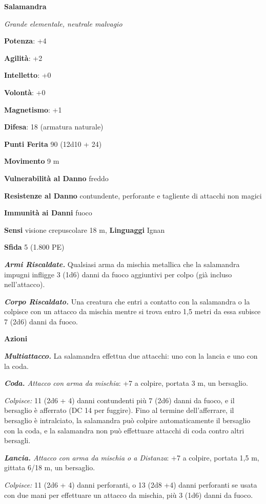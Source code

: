\begin{multicols}{2}
\textbf{Salamandra}

\emph{Grande elementale, neutrale malvagio}

\textbf{Potenza}: +4

\textbf{Agilità}: +2

\textbf{Intelletto}: +0

\textbf{Volontà}: +0

\textbf{Magnetismo}: +1

\textbf{Difesa}: 18 (armatura naturale)

\textbf{Punti Ferita} 90 (12d10 + 24)

\textbf{Movimento} 9 m

\textbf{Vulnerabilità al Danno} freddo

\textbf{Resistenze al Danno} contundente, perforante e tagliente di
attacchi non magici

\textbf{Immunità ai Danni} fuoco

\textbf{Sensi} visione crepuscolare 18 m, 
\textbf{Linguaggi} Ignan

\textbf{Sfida} 5 (1.800 PE)

\emph{\textbf{Armi Riscaldate.}} Qualsiasi arma da mischia metallica che
la salamandra impugni infligge 3 (1d6) danni da fuoco aggiuntivi per
colpo (già incluso nell'attacco).

\emph{\textbf{Corpo Riscaldato.}} Una creatura che entri a contatto con
la salamandra o la colpisce con un attacco da mischia mentre si trova
entro 1,5 metri da essa subisce 7 (2d6) danni da fuoco.

\textbf{Azioni}

\emph{\textbf{Multiattacco.}} La salamandra effettua due attacchi: uno
con la lancia e uno con la coda.

\emph{\textbf{Coda.} Attacco con arma da mischia}: +7 a colpire, portata
3 m, un bersaglio.

\emph{Colpisce:} 11 (2d6 + 4) danni contundenti più 7 (2d6) danni da
fuoco, e il bersaglio è afferrato (DC 14 per fuggire). Fino al termine
dell'afferrare, il bersaglio è intralciato, la salamandra può colpire
automaticamente il bersaglio con la coda, e la salamandra non può
effettuare attacchi di coda contro altri bersagli.

\emph{\textbf{Lancia.} Attacco con arma da mischia o a Distanza}: +7 a
colpire, portata 1,5 m, gittata 6/18 m, un bersaglio.

\emph{Colpisce:} 11 (2d6 + 4) danni perforanti, o 13 (2d8 +4) danni
perforanti se usata con due mani per effettuare un attacco da mischia,
più 3 (1d6) danni da fuoco.




\end{multicols}

